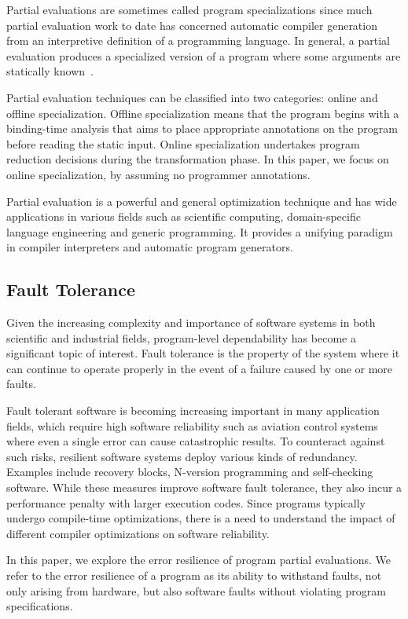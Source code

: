 \bigbreak

Partial evaluations are sometimes called program specializations since much partial evaluation work to date has concerned automatic compiler generation from an interpretive definition of a programming language.
In general, a partial evaluation produces a specialized version of a program where some arguments are statically known~\cite{Jones1996}. 

Partial evaluation techniques can be classified into two categories: online and offline specialization.
Offline specialization means that the program begins with a binding-time analysis that aims to place appropriate annotations on the program before reading the static input.
Online specialization undertakes program reduction decisions during the transformation phase. In this paper, we focus on online specialization, by assuming no programmer annotations. 

Partial evaluation is a powerful and general optimization technique and has wide applications in various fields such as scientific computing, domain-specific language engineering and generic programming.
It provides a unifying paradigm in compiler interpreters and automatic program generators.

\subsection{Fault Tolerance}
\label{sec:fault_tolerance}
Given the increasing complexity and importance of software systems in both scientific and industrial fields, program-level dependability has become a significant topic of interest.
Fault tolerance is the property of the system where it can continue to operate properly in the event of a failure caused by one or more faults.

Fault tolerant software is becoming increasing important in many application fields, which require high software reliability such as aviation control systems where even a single error can cause catastrophic results.
To counteract against such risks, resilient software systems deploy various kinds of redundancy.
Examples include recovery blocks, N-version programming and self-checking software.
While these measures improve software fault tolerance, they also incur a performance penalty with larger execution codes.
Since programs typically undergo compile-time optimizations, there is a need to understand the impact of different compiler optimizations on software reliability.

In this paper, we explore the error resilience of program partial evaluations. We refer to the error resilience of a program as its ability to withstand faults, not only arising from hardware, but also software faults without violating program specifications. 

